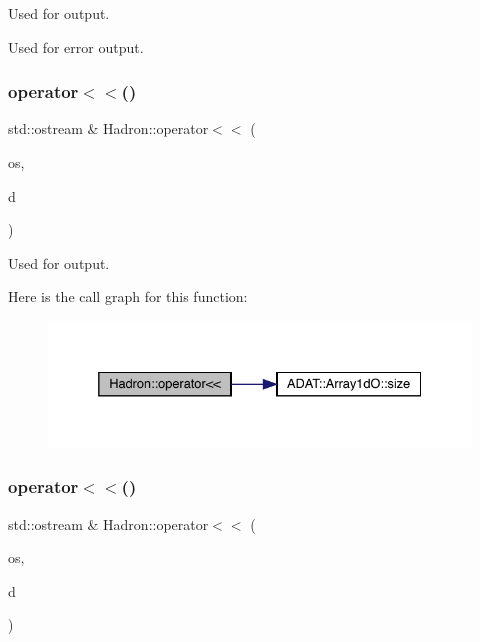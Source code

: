 Used for output. 

Used for error output. \mbox{\label{namespaceHadron_a608c5684c94df31a4fd84527e9508b27}} 
\subsubsection{\texorpdfstring{operator$<$$<$()}{operator<<()}\hspace{0.1cm}{\footnotesize\ttfamily [30/48]}}
{\footnotesize\ttfamily std\+::ostream \& Hadron\+::operator$<$$<$ (\begin{DoxyParamCaption}\item[{std\+::ostream \&}]{os,  }\item[{const \mbox{\hyperlink{classADAT_1_1Array1dO}{Array1dO}}$<$ \mbox{\hyperlink{structHadron_1_1KeyHadronSUNNPartIrrepOp__t_1_1CGPair__t}{Key\+Hadron\+S\+U\+N\+N\+Part\+Irrep\+Op\+\_\+t\+::\+C\+G\+Pair\+\_\+t}} $>$ \&}]{d }\end{DoxyParamCaption})}



Used for output. 

Here is the call graph for this function\+:
\nopagebreak
\begin{figure}[H]
\begin{center}
\leavevmode
\includegraphics[width=332pt]{d1/daf/namespaceHadron_a608c5684c94df31a4fd84527e9508b27_cgraph}
\end{center}
\end{figure}
\mbox{\label{namespaceHadron_adc0e10e53889cf8575df386122424913}} 
\subsubsection{\texorpdfstring{operator$<$$<$()}{operator<<()}\hspace{0.1cm}{\footnotesize\ttfamily [31/48]}}
{\footnotesize\ttfamily std\+::ostream \& Hadron\+::operator$<$$<$ (\begin{DoxyParamCaption}\item[{std\+::ostream \&}]{os,  }\item[{const \mbox{\hyperlink{classADAT_1_1Array1dO}{Array1dO}}$<$ \mbox{\hyperlink{structHadron_1_1KeyHadronNode__t_1_1Quark__t}{Key\+Hadron\+Node\+\_\+t\+::\+Quark\+\_\+t}} $>$ \&}]{d }\end{DoxyParamCaption})}



